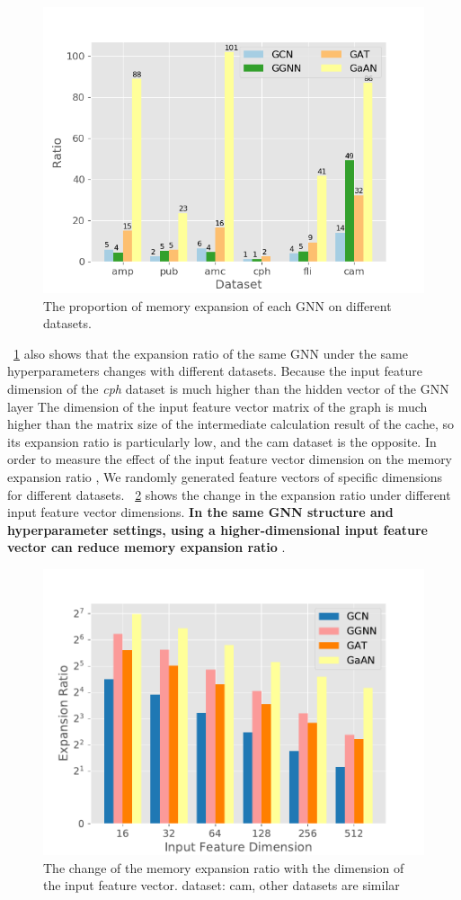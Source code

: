 \begin{figure}
    \centering
    \includegraphics[width=0.7\columnwidth]{figs/experiments/exp_memory_expansion_ratio.png}
    \caption{The proportion of memory expansion of each GNN on different datasets.}
    \label{fig:exp_memory_expansion_ratio}
\end{figure}

\figurename~\ref{fig:exp_memory_expansion_ratio} also shows that the expansion ratio of the same GNN under the same hyperparameters changes with different datasets.
Because the input feature dimension of the \textit{cph} dataset is much higher than the hidden vector of the GNN layer The dimension of the input feature vector matrix
of the graph is much higher than the matrix size of the intermediate calculation result of the cache,
so its expansion ratio is particularly low, and the cam dataset is the opposite. In order to measure the effect of the input feature vector dimension on the memory
expansion ratio , We randomly generated feature vectors of specific dimensions for different datasets.
\figurename~\ref{fig:exp_memory_expension_ratio_input_feature_dimension} shows the change in the expansion ratio under different input feature vector dimensions.
\textbf{In the same GNN structure and hyperparameter settings, using a higher-dimensional input feature vector can reduce memory expansion ratio} .

\begin{figure}
    \centering
    \includegraphics[width=0.7\columnwidth]{figs/experiments/exp_memory_expansion_ratio_input_feature_dimension_com-amazon.pdf}
    \caption{The change of the memory expansion ratio with the dimension of the input feature vector. dataset: cam, other datasets are similar}
    \label{fig:exp_memory_expension_ratio_input_feature_dimension}
\end{figure}

